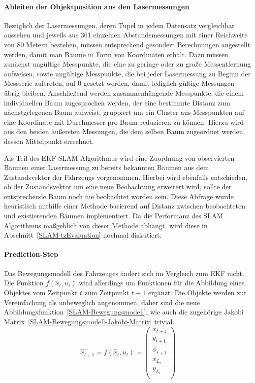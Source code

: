 \documentclass[11pt]{scrartcl}
\begin{document}
{\paragraph{Ableiten der Objektposition aus den Lasermessungen}
Bezüglich der Lasermessungen, deren Tupel in jedem Datensatz vergleichbar aussehen und jeweils aus 361 einzelnen Abstandsmessungen mit einer Reichweite von 80 Metern bestehen, müssen entsprechend gesondert Berechnungen angestellt werden, damit man Bäume in Form von Koordinaten erhält. Dazu müssen zunächst ungültige Messpunkte, die eine zu geringe oder zu große Messentfernung aufweisen, sowie ungültige Messpunkte, die bei jeder Lasermessung zu Beginn der Messserie auftreten, auf 0 gesetzt werden, damit lediglich gültige Messungen übrig bleiben. Anschließend werden zusammenhängende Messpunkte, die einem individuellen Baum zugesprochen werden, der eine bestimmte Distanz zum nächstgelegenen Baum aufweist, gruppiert um ein Cluster aus Messpunkten auf eine Koordinate mit Durchmesser pro Baum reduzieren zu können. Hierzu wird aus den beiden äußersten Messungen, die dem selben Baum zugeordnet werden, dessen Mittelpunkt errechnet.

Als Teil des EKF-SLAM Algorithmus wird eine Zuordnung von observierten Bäumen einer Lasermessung zu bereits bekannten Bäumen aus dem Zustandsvektor der Fahrzeugs vorgenommen. Hierbei wird ebenfalls entschieden, ob der Zustandsvektor um eine neue Beobachtung erweitert wird, sollte der entsprechende Baum noch nie beobachtet worden sein. Diese Abfrage wurde heuristisch mithilfe einer Methode basierend auf Distanz zwischen beobachteten und existierenden Bäumen implementiert. Da die Performanz des SLAM Algorithmus maßgeblich von dieser Methode abhängt, wird diese in Abschnitt~\ref{SLAM-tzEvaluation} nochmal diskutiert. 

\paragraph{Prediction-Step}
Das Bewegungsmodell des Fahrzeuges ändert sich im Vergleich zum EKF nicht. Die Funktion $f(\hat{x}_t, u_t)$ wird allerdings um Funktionen für die Abbildung eines Objektes vom Zeitpunkt $t$ zum Zeitpunkt $t+1$ ergänzt. Die Objekte werden zur Vereinfachung als unbeweglich angenommen, daher sind die neue Abbildungsfunktion~\ref{SLAM-Bewegungsmodell}, wie auch die zugehörige Jakobi Matrix~\eqref{SLAM-Bewegungsmodell-Jakobi-Matrix} trivial.
\begin{equation}\label{SLAM-Bewegungsmodell}
	\hat{x}_{t+1}^- = f(\hat{x}_{t},u_t) = \begin{pmatrix}
		x_{t+1} \\
		y_{t+1} \\
		\phi_{t+1} \\
		x_{L_t} \\
		y_{L_t} \\
	\end{pmatrix}
\end{equation}

}
\end{document}
